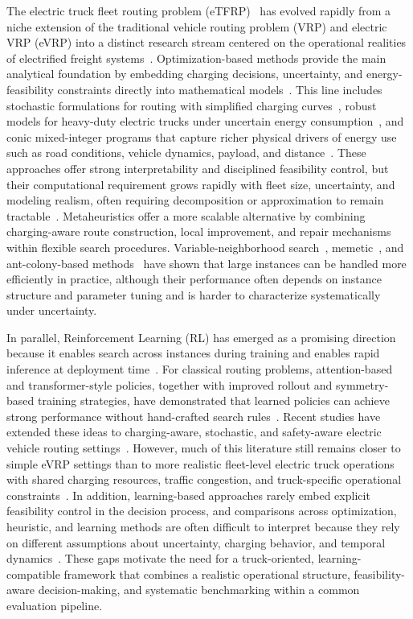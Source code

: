 \documentclass[a4paper,fleqn]{cas-sc}
\begin{document}
The electric truck fleet routing problem (eTFRP)~\cite{ziyan2025} has evolved rapidly from a niche extension of the traditional vehicle routing problem (VRP) and electric VRP (eVRP) into a distinct research stream centered on the operational realities of electrified freight systems~\cite{cataldo_2023}. Optimization-based methods provide the main analytical foundation by embedding charging decisions, uncertainty, and energy-feasibility constraints directly into mathematical models~\cite{ziyan2025}. This line includes stochastic formulations for routing with simplified charging curves~\cite{SPINELLI2026105480}, robust models for heavy-duty electric trucks under uncertain energy consumption~\cite{AMIRI2023109108}, and conic mixed-integer programs that capture richer physical drivers of energy use such as road conditions, vehicle dynamics, payload, and distance~\cite{WANG2024123407}. These approaches offer strong interpretability and disciplined feasibility control, but their computational requirement grows rapidly with fleet size, uncertainty, and modeling realism, often requiring decomposition or approximation to remain tractable~\cite{lara_electric_2020}. Metaheuristics offer a more scalable alternative by combining charging-aware route construction, local improvement, and repair mechanisms within flexible search procedures. Variable-neighborhood search~\cite{euchi_hybrid_2023}, memetic~\cite{dong_dynamic_2023}, and ant-colony-based methods~\cite{9409782} have shown that large instances can be handled more efficiently in practice, although their performance often depends on instance structure and parameter tuning and is harder to characterize systematically under uncertainty.

In parallel, Reinforcement Learning (RL) has emerged as a promising direction~\cite{evgnn} because it enables search across instances during training and enables rapid inference at deployment time~\citep{kool2018attention}. For classical routing problems, attention-based and transformer-style policies, together with improved rollout and symmetry-based training strategies, have demonstrated that learned policies can achieve strong performance without hand-crafted search rules~\citep{yang2025neural,Sym-NCO}. Recent studies have extended these ideas to charging-aware, stochastic, and safety-aware electric vehicle routing settings~\cite{BASSO2022102496}. However, much of this literature still remains closer to simple eVRP settings than to more realistic fleet-level electric truck operations with shared charging resources, traffic congestion, and truck-specific operational constraints~\citep{lin2025, TANG2023121711}. In addition, learning-based approaches rarely embed explicit feasibility control in the decision process, and comparisons across optimization, heuristic, and learning methods are often difficult to interpret because they rely on different assumptions about uncertainty, charging behavior, and temporal dynamics~\cite{lin2022}. These gaps motivate the need for a truck-oriented, learning-compatible framework that combines a realistic operational structure, feasibility-aware decision-making, and systematic benchmarking within a common evaluation pipeline.
\end{document}
